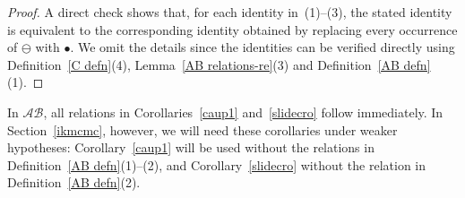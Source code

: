 \documentclass[a4,10pt]{amsart}
\numberwithin{equation}{section}
\theoremstyle{definition}
\newcommand{\AB}{\mathcal{AB}}
\begin{document}
\begin{proof}
   A direct check shows   
 that, for each identity in~(1)--(3),
the stated identity is equivalent to the corresponding identity obtained by replacing
every occurrence of $\ominus$ with $\bullet$. We omit the details since the identities  can be verified directly using Definition~\ref{C defn}(4), Lemma~\ref{AB relations-re}(3) and Definition~\ref{AB defn}(1). \end{proof}

In $\AB$, all relations in Corollaries~\ref{caup1} and~\ref{slidecro} follow immediately. In Section~\ref{ikmcmc}, however, we will need these corollaries under weaker hypotheses: Corollary~\ref{caup1} will be used without the relations in Definition~\ref{AB defn}(1)--(2), and Corollary~\ref{slidecro} without the relation in Definition~\ref{AB defn}(2).
\end{document}
